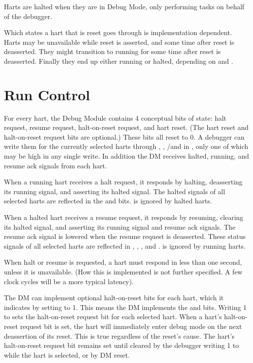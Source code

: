 Harts are halted when they are in Debug Mode, only performing tasks on behalf
of the debugger.

Which states a hart that is reset goes through is implementation dependent.
Harts may be unavailable while reset is asserted, and some time after reset is
deasserted. They might transition to running for some time after reset is
deasserted. Finally they end up either running or halted, depending on
\Fhaltreq and \Fresethaltreq.

\section{Run Control} \label{runcontrol}

For every hart, the Debug Module contains 4 conceptual bits of state: halt
request, resume request, halt-on-reset request,  and hart reset.
(The hart reset and halt-on-reset request bits are optional.)
These bits all reset to 0. A debugger can write them for the currently selected
harts through \Fhaltreq, \Fresumereq, \Fsetresethaltreq/\Fclrresethaltreq and
\Fhartreset in \Rdmcontrol, only one of which may be high in any single write.
In addition the DM receives halted, running, and resume ack signals from each
hart.

When a running hart receives a halt request, it responds by halting,
deasserting its running signal, and asserting its halted signal. The halted
signals of all selected harts are reflected in the \Fallhalted and \Fanyhalted
bits. \Fhaltreq is ignored by halted harts.

When a halted hart receives a resume request, it responds by resuming, clearing
its halted signal, and asserting its running signal and resume ack signals. The
resume ack signal is lowered when the resume request is deasserted.  These
status signals of all selected harts are reflected in \Fallresumeack,
\Fanyresumeack, \Fallrunning, and \Fanyrunning. \Fresumereq is ignored by
running harts.

When halt or resume is requested, a hart must respond in
less than one second, unless it is unavailable.
(How this is implemented is not further specified. A few
clock cycles will be a more typical latency).

The DM can implement optional halt-on-reset bits for each hart,
which it indicates by setting \Fhasresethaltreq to 1.
This means the DM implements the \Fsetresethaltreq and \Fclrresethaltreq bits.
Writing 1 to \Fsetresethaltreq sets the halt-on-reset request bit for each
selected hart.
When a hart's halt-on-reset request bit is set, the hart will immediately enter
debug mode on the next deassertion of its reset. This is true regardless of
the reset's cause.
The hart's halt-on-reset request bit remains set
until cleared by the debugger writing 1 to \Fclrresethaltreq
while the hart is selected, or by DM reset.

